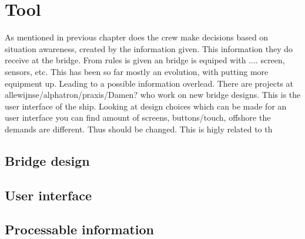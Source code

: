 \section{Tool}
As mentioned in previous chapter does the crew make decisions based on situation awareness, created by the information given. This information they do receive at the bridge.
From rules is given an bridge is equiped with .... screen, sensors, etc.
This has been so far mostly an evolution, with putting more equipment up. Leading to a possible information overlead. 
There are projects at allewijnse/alphatron/praxis/Damen? who work on new bridge designs. This is the user interface of the ship.
Looking at design choices which can be made for an user interface you can find amount of screens, buttons/touch, offshore the demands are different. Thus should be changed. 
This is higly related to th

\subsection{Bridge design}

\subsection{User interface}

\subsection{Processable information}